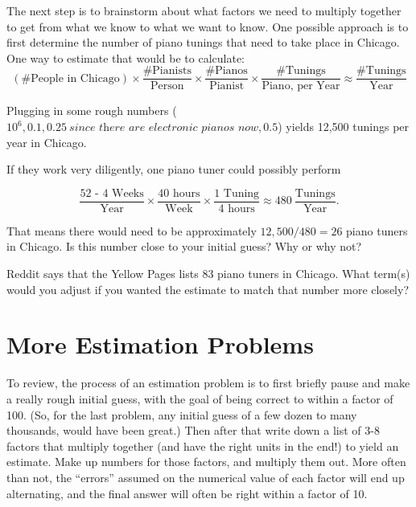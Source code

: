\documentclass[12pt]{article}
\begin{document}
The next step is to brainstorm about what factors we need to multiply together to get from what we know to what we want to know. One possible approach is to first determine the number of piano tunings that need to take place in Chicago. One way to estimate that would be to calculate:
\begin{equation}
(\textrm{\# People in Chicago})\times\frac{\textrm{\# Pianists}}{\textrm{Person}}\times\frac{\textrm{\# Pianos}}{\textrm{Pianist}}\times\frac{\textrm{\# Tunings}}{\textrm{Piano, per Year}} \approx \frac{\textrm{\# Tunings}}{\textrm{Year}}
\end{equation}

Plugging in some rough numbers ($10^6, 0.1, 0.25~\textit{since there are electronic pianos now}, 0.5$) yields 12,500 tunings per year in Chicago.

If they work very diligently, one piano tuner could possibly perform

\begin{equation}
\frac{\textrm{52 - 4 Weeks}}{\textrm{Year}}\times\frac{\textrm{40 hours}}{\textrm{Week}}\times\frac{\textrm{1 Tuning}}{\textrm{4 hours}} \approx 480~\frac{\textrm{Tunings}}{\textrm{Year}}.
\end{equation}

That means there would need to be approximately $12,500 / 480 = 26$ piano tuners in Chicago. Is this number close to your initial guess? Why or why not?

Reddit says that the Yellow Pages lists 83 piano tuners in Chicago. What term(s) would you adjust if you wanted the estimate to match that number more closely?

\section{More Estimation Problems}

To review, the process of an estimation problem is to first briefly pause and make a really rough initial guess, with the goal of being correct to within a factor of 100. (So, for the last problem, any initial guess of a few dozen to many thousands, would have been great.) Then after that write down a list of 3-8 factors that multiply together (and have the right units in the end!) to yield an estimate. Make up numbers for those factors, and multiply them out. More often than not, the ``errors'' assumed on the numerical value of each factor will end up alternating, and the final answer will often be right within a factor of 10.
\end{document}

